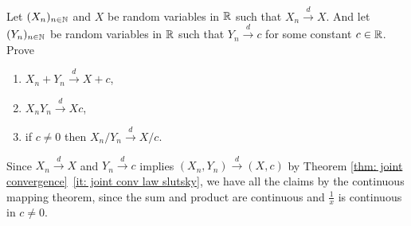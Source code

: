 
\begin{exercise}[subtitle={Slutsky's theorem \Coffeecup}]
    Let \((X_n)_{n\in \mathbb{N}}\) and \(X\) be random variables in \(\mathbb{R}\)
    such that \(X_n \overset{d}\to X\). And let \((Y_n)_{n\in \mathbb{N}}\) be random
    variables in \(\mathbb{R}\) such that \(Y_n \overset{d}\to c\) for some
    constant \(c\in \mathbb{R}\). Prove
    \begin{enumerate}[label=(\alph*), noitemsep]
        \item \(X_n + Y_n \overset{d}\to X + c\),
        \item \(X_n Y_n \overset{d}\to X c\),
        \item if \(c \neq 0\) then \(X_n/Y_n \overset{d}\to X/c\).
    \end{enumerate}
\end{exercise}

\begin{solution}
    Since \(X_n \overset{d}\to X\) and \(Y_n \overset{d}\to c\) implies
    \((X_n, Y_n) \overset{d}\to (X,c)\) by Theorem \ref{thm: joint
    convergence}~\ref{it: joint conv law slutsky}, we have all the claims by
    the continuous mapping theorem, since the sum and product are continuous
    and \(\frac1x\) is continuous in \(c \neq 0\).
\end{solution}
